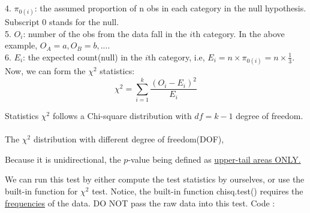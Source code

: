\documentclass[12pt]{article}
\begin{document}
4. $ \pi_{0(i)} $: the assumed proportion of n obs in each category
in the null hypothesis. Subscript $ 0 $ stands for the null.\\
5. $ O_{i} $: number of the obs from the data fall in the $ i $th 
category. In the above example, $ O_{A} = a, O_{B} = b, ... $.\\
6. $ E_{i} $: the expected count(null) in the $ i $th category, i.e, 
$ E_{i} = n  \times \pi_{0(i)} = n  \times \frac{1}{3} $.\\


Now, we can form the $ \chi^{2} $ statistics:
\begin{equation*}
\chi^{2} = \sum\limits_{i = 1} ^k
\frac{(O_{i} - E_{i})^{2}}{E_{i}}
\end{equation*}

Statistics $ \chi^{2} $ follows a Chi-square distribution with
$ df = k - 1 $ degree of freedom.\\

\newpage
\noindent{}\\


The $ \chi^{2} $ distribution with different degree of freedom(DOF),

\begin{figure}[H]
\end{figure}


Because it is unidirectional, the $ p $-value being defined as
{\underline {upper-tail areas ONLY.}}


We can run this test by either compute the test statistics by ourselves,
or use the built-in function for $ \chi^{2} $ test.
Notice, the built-in function chisq.test() requires the
{\underline {frequencies}} of the data. DO NOT pass the raw data
into this test. Code :
\end{document}
